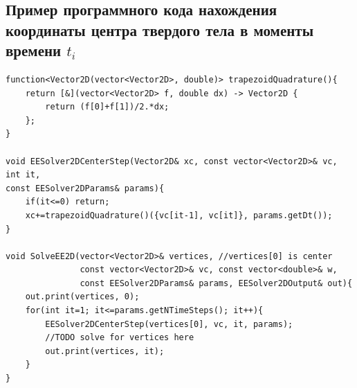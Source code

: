 \documentclass[12pt,a4paper]{article}
\begin{document}
\subsection{Пример программного кода нахождения координаты центра твердого тела в моменты времени $t_i$}
\label{code:xc}
\begin{lstlisting}
function<Vector2D(vector<Vector2D>, double)> trapezoidQuadrature(){
    return [&](vector<Vector2D> f, double dx) -> Vector2D {
        return (f[0]+f[1])/2.*dx;
    };
}

void EESolver2DCenterStep(Vector2D& xc, const vector<Vector2D>& vc, int it,
const EESolver2DParams& params){
    if(it<=0) return;
    xc+=trapezoidQuadrature()({vc[it-1], vc[it]}, params.getDt());
}

void SolveEE2D(vector<Vector2D>& vertices, //vertices[0] is center
               const vector<Vector2D>& vc, const vector<double>& w,
               const EESolver2DParams& params, EESolver2DOutput& out){
    out.print(vertices, 0);
    for(int it=1; it<=params.getNTimeSteps(); it++){
        EESolver2DCenterStep(vertices[0], vc, it, params);
        //TODO solve for vertices here
        out.print(vertices, it);
    }
}
\end{lstlisting}
\end{document}
